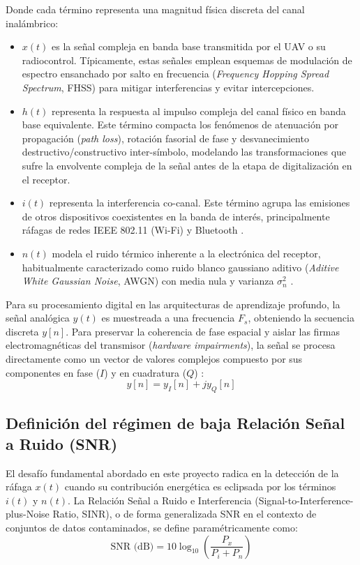 Donde cada término representa una magnitud física discreta del canal inalámbrico:
\begin{itemize}
    \item $x(t)$ es la señal compleja en banda base transmitida por el UAV o su radiocontrol. Típicamente, estas señales emplean esquemas de modulación de espectro ensanchado por salto en frecuencia (\textit{Frequency Hopping Spread Spectrum}, FHSS) para mitigar interferencias y evitar intercepciones.
    \item $h(t)$ representa la respuesta al impulso compleja del canal físico en banda base equivalente. Este término compacta los fenómenos de atenuación por propagación (\textit{path loss}), rotación fasorial de fase y desvanecimiento destructivo/constructivo inter-símbolo, modelando las transformaciones que sufre la envolvente compleja de la señal antes de la etapa de digitalización en el receptor.
    \item $i(t)$ representa la interferencia co-canal. Este término agrupa las emisiones de otros dispositivos coexistentes en la banda de interés, principalmente ráfagas de redes IEEE 802.11 (Wi-Fi) y Bluetooth \cite{ezuma_detection_2020}.
    \item $n(t)$ modela el ruido térmico inherente a la electrónica del receptor, habitualmente caracterizado como ruido blanco gaussiano aditivo (\textit{Aditive White Gaussian Noise}, AWGN) con media nula y varianza $\sigma_n^2$ \cite{lacy_machine_2024}.
\end{itemize}

Para su procesamiento digital en las arquitecturas de aprendizaje profundo, la señal analógica $y(t)$ es muestreada a una frecuencia $F_s$, obteniendo la secuencia discreta $y[n]$. Para preservar la coherencia de fase espacial y aislar las firmas electromagnéticas del transmisor (\textit{hardware impairments}), la señal se procesa directamente como un vector de valores complejos compuesto por sus componentes en fase ($I$) y en cuadratura ($Q$) \cite{valkama_blind_2005, zheng_deep_2025}:
\begin{equation}
    y[n] = y_I[n] + j y_Q[n]
    \label{eq:iq_discreta}
\end{equation}

\subsection{Definición del régimen de baja Relación Señal a Ruido (SNR)}
El desafío fundamental abordado en este proyecto radica en la detección de la ráfaga $x(t)$ cuando su contribución energética es eclipsada por los términos $i(t)$ y $n(t)$. La Relación Señal a Ruido e Interferencia (Signal-to-Interference-plus-Noise Ratio, SINR), o de forma generalizada SNR en el contexto de conjuntos de datos contaminados, se define paramétricamente como:
\begin{equation}
    \text{SNR (dB)} = 10 \log_{10} \left( \frac{P_x}{P_i + P_n} \right)
    \label{eq:snr_calculo}
\end{equation}

